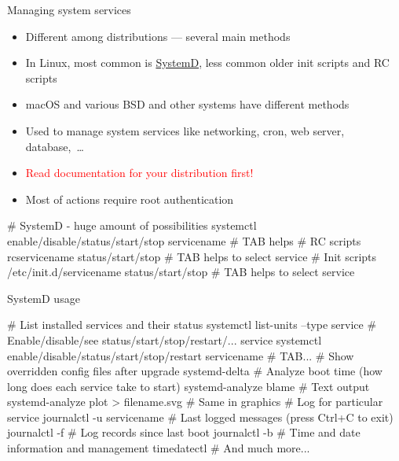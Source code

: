 \documentclass[compress, ucs, xelatex, 11pt, xcolor=svgnames, aspectratio=169,
	hyperref={
		bookmarks=true,
		unicode=true,
		colorlinks=true,
		pdftitle={Linux, command line and MetaCentrum},
		plainpages=false,
		pdfauthor={Vojtech Zeisek},
		pdfsubject={Course about use of Linux command line, writing shell scripts and using MetaCentrum of CESNET},
		pdfcreator={XeLaTeX},
		pdfkeywords={Linux, GNU, BASH, shell, command line, MetaCentrum},
		linkcolor=DarkRed, %
		anchorcolor=DarkBlue, %
		citecolor=Indigo, %
		filecolor=NavyBlue, %
		menucolor=DarkMagenta, %
		urlcolor=DarkBlue, %
		pdftex},
	url={hyphens, lowtilde} %
	]{beamer}
\renewcommand{\alert}[1]{\textcolor{red}{#1}}
\begin{document}
\begin{frame}[fragile]{Managing system services}
	\begin{itemize}
		\item Different among distributions --- several main methods
		\item In Linux, most common is \href{https://wiki.freedesktop.org/www/Software/systemd/}{SystemD}, less common older init scripts and RC scripts
		\item macOS and various BSD and other systems have different methods
		\item Used to manage system services like networking, cron, web server, database,~\ldots
		\item \alert{Read documentation for your distribution first!}
		\item Most of actions require root authentication
	\end{itemize}
	\vfill
	\begin{bashcode}
    # SystemD - huge amount of possibilities
    systemctl enable/disable/status/start/stop servicename # TAB helps
    # RC scripts
    rcservicename status/start/stop # TAB helps to select service
    # Init scripts
    /etc/init.d/servicename status/start/stop # TAB helps to select service
	\end{bashcode}
\end{frame}

\begin{frame}[fragile]{SystemD usage}
	\begin{bashcode}
    # List installed services and their status
    systemctl list-units --type service
    # Enable/disable/see status/start/stop/restart/... service
    systemctl enable/disable/status/start/stop/restart servicename # TAB...
    # Show overridden config files after upgrade
    systemd-delta
    # Analyze boot time (how long does each service take to start)
    systemd-analyze blame # Text output
    systemd-analyze plot > filename.svg # Same in graphics
    # Log for particular service
    journalctl -u servicename
    # Last logged messages (press Ctrl+C to exit)
    journalctl -f
    # Log records since last boot
    journalctl -b
    # Time and date information and management
    timedatectl
    # And much more...
	\end{bashcode}
\end{frame}

\end{document}
